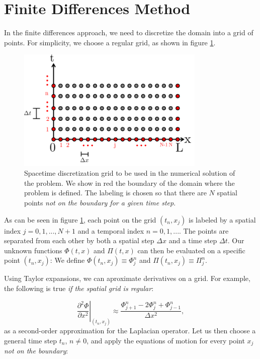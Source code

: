 \documentclass{article}
\begin{document}
\section{Finite Differences Method}

In the finite differences approach, we need to discretize the domain into a grid of points. For simplicity, we choose a regular grid, as shown in figure \ref{fig1}.

\begin{figure}[H]
\centering
\includegraphics[width=0.8\textwidth]{figgrid}
\caption{\label{fig1}Spacetime discretization grid to be used in the numerical solution of the problem. We show in red the boundary of the domain where the problem is defined. The labeling is chosen so that there are $N$ spatial points \textit{not on the boundary for a given time step}.}
\end{figure}

As can be seen in figure \ref{fig1}, each point on the grid $(t_n,x_j)$ is labeled by a spatial index $j=0,1,..., N+1$ and a temporal index $n=0,1,...$. The points are separated from each other by both a spatial step $\Delta x$ and a time step $\Delta t$. Our unknown functions $\Phi(t,x)$ and $\Pi(t,x)$ can then be evaluated on a specific point $(t_n,x_j)$: We define $\Phi(t_n,x_j)\equiv \Phi^n_j$ and $\Pi(t_n,x_j)\equiv \Pi^n_j$.

Using Taylor expansions, we can aproximate derivatives on a grid. For example, the following is true \textit{if the spatial grid is regular}:

\begin{equation}\label{te}
\left.\frac{\partial^2 \Phi}{\partial x^2}\right|_{(t_n,x_j)}\approx\frac{\Phi^n_{j+1}-2\Phi^n_j+\Phi^n_{j-1}}{\Delta x^2},
\end{equation}
as a second-order approximation for the Laplacian operator. Let us then choose a general time step $t_n$, $n\neq0$, and apply the equations of motion for every point $x_j$ \textit{not on the boundary}:
\end{document}
